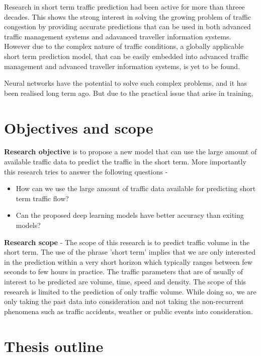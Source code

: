 Research in short term traffic prediction had been active for more than threee decades. This shows the
strong interest in solving the growing problem of traffic congestion by providing accurate predictions
that can be used in both advanced traffic management systems and adavanced traveller information systems.
However due to the complex nature of traffic conditions, a globally applicable short term prediction
model, that can be easily embedded into advanced traffic management and advanced traveller information
systems, is yet to be found.

Neural networks have the potential to solve such complex problems, and it has been realised long term
ago. But due to the practical issue that arise in training,

\section{Objectives and scope}

\textbf{Research objective} is to propose a new model that can use the large amount of available
traffic data to predict the traffic in the short term. More importantly this research tries to
answer the following questions -

\begin{itemize}
\item How can we use the large amount of traffic data available for predicting short term traffic
 flow?
\item Can the proposed deep learning models have better accuracy than exiting models?
\end{itemize}

\textbf{Research scope} - The scope of this research is to predict traffic volume in the
short term. The use of the phrase 'short term' implies that we are only interested in the
prediction within a very short horizon which typically ranges between few seconds to few
hours in practice. The traffic parameters that are of usually of interest to be predicted are
volume, time, speed and density. The scope of this research is limited to the prediction of only
traffic volume. While doing so, we are only taking the past data into consideration and not
taking the non-recurrent phenomena such as traffic accidents, weather or public events into
consideration.


\section{Thesis outline}

